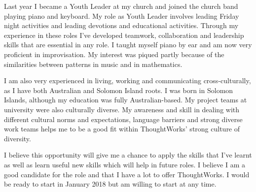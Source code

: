 \documentclass[12pt, a4paper]{awesome-cv} %
\begin{document}
\begin{cvletter}
Last year I became a Youth Leader at my church and joined the church band playing piano and keyboard. My role as Youth Leader involves leading Friday night activities and leading devotions and educational activities. Through my experience in these roles I've developed teamwork, collaboration and leadership skills that are essential in any role. I taught myself piano by ear and am now very proficient in improvisation. My interest was piqued partly because of the similarities between  patterns in music and in mathematics.

I am also very experienced in living, working and communicating cross-culturally, as I have both Australian and Solomon Island roots. I was born in Solomon Islands, although my education was fully Australian-based. My project teams at university were also culturally diverse. My awareness and skill in dealing with different cultural norms and expectations, language barriers and strong diverse work teams helps me to be a good fit within ThoughtWorks' strong culture of diversity.  

I believe this opportunity will give me a chance to apply the skills that I've learnt as well as learn useful new skills which will help in future roles. I believe I am a good candidate for the role and that I have a lot to offer ThoughtWorks. I would be ready to start in January 2018 but am willing to start at any time.


\end{cvletter}


\makeletterclosing %
\end{document}
